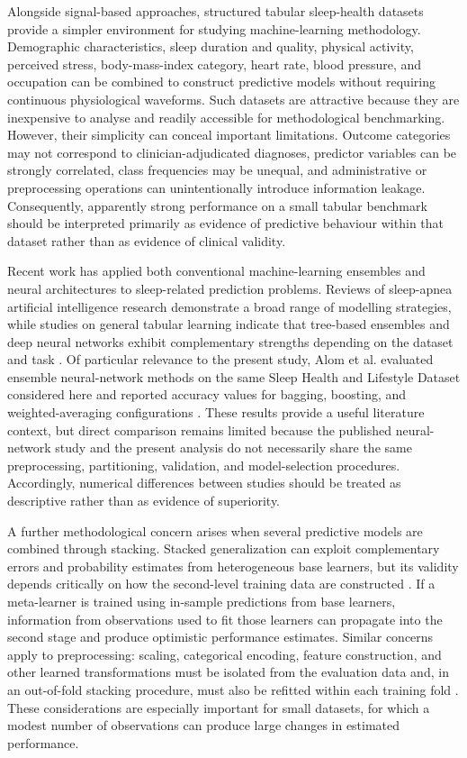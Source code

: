 \documentclass[a4paper,fleqn]{cas-dc}
\begin{document}
Alongside signal-based approaches, structured tabular sleep-health datasets provide a simpler environment for studying machine-learning methodology. Demographic characteristics, sleep duration and quality, physical activity, perceived stress, body-mass-index category, heart rate, blood pressure, and occupation can be combined to construct predictive models without requiring continuous physiological waveforms. Such datasets are attractive because they are inexpensive to analyse and readily accessible for methodological benchmarking. However, their simplicity can conceal important limitations. Outcome categories may not correspond to clinician-adjudicated diagnoses, predictor variables can be strongly correlated, class frequencies may be unequal, and administrative or preprocessing operations can unintentionally introduce information leakage. Consequently, apparently strong performance on a small tabular benchmark should be interpreted primarily as evidence of predictive behaviour within that dataset rather than as evidence of clinical validity.

Recent work has applied both conventional machine-learning ensembles and neural architectures to sleep-related prediction problems. Reviews of sleep-apnea artificial intelligence research demonstrate a broad range of modelling strategies, while studies on general tabular learning indicate that tree-based ensembles and deep neural networks exhibit complementary strengths depending on the dataset and task \cite{bazoukis2023,tyagi2023,abdalrazaq2024,borisov2024}. Of particular relevance to the present study, Alom et al. evaluated ensemble neural-network methods on the same Sleep Health and Lifestyle Dataset considered here and reported accuracy values for bagging, boosting, and weighted-averaging configurations \cite{alom2024}. These results provide a useful literature context, but direct comparison remains limited because the published neural-network study and the present analysis do not necessarily share the same preprocessing, partitioning, validation, and model-selection procedures. Accordingly, numerical differences between studies should be treated as descriptive rather than as evidence of superiority.

A further methodological concern arises when several predictive models are combined through stacking. Stacked generalization can exploit complementary errors and probability estimates from heterogeneous base learners, but its validity depends critically on how the second-level training data are constructed \cite{wolpert1992}. If a meta-learner is trained using in-sample predictions from base learners, information from observations used to fit those learners can propagate into the second stage and produce optimistic performance estimates. Similar concerns apply to preprocessing: scaling, categorical encoding, feature construction, and other learned transformations must be isolated from the evaluation data and, in an out-of-fold stacking procedure, must also be refitted within each training fold \cite{kapoor2023,efthimiou2024,collins2024}. These considerations are especially important for small datasets, for which a modest number of observations can produce large changes in estimated performance.
\end{document}
